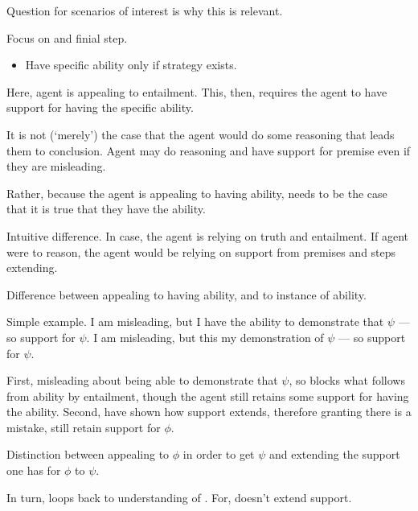 \begin{note}
  Question for scenarios of interest is why this is relevant.

  Focus on \AR{} and finial step.
  \begin{itemize}
  \item Have specific ability only if strategy exists.
  \end{itemize}
  Here, agent is appealing to entailment.
  This, then, requires the agent to have support for having the specific ability.

  It is not (`merely') the case that the agent would do some reasoning that leads them to conclusion.
  Agent may do reasoning and have support for premise even if they are misleading.

  Rather, because the agent is appealing to having ability, needs to be the case that it is true that they have the ability.

  
  Intuitive difference.
  In \AR{} case, the agent is relying on truth and entailment.
  If agent were to reason, the agent would be relying on support from premises and steps extending.

  Difference between appealing to having ability, and to instance of ability.

  Simple example.
  I am misleading, but I have the ability to demonstrate that \(\psi\) --- so support for \(\psi\).
  I am misleading, but this my demonstration of \(\psi\) --- so support for \(\psi\).

  First, misleading about being able to demonstrate that \(\psi\), so blocks what follows from ability by entailment, though the agent still retains some support for having the ability.
  Second, have shown how support extends, therefore granting there is a mistake, still retain support for \(\phi\).

  Distinction between appealing to \(\phi\) in order to get \(\psi\) and extending the support one has for \(\phi\) to \(\psi\).

  In turn, loops back to understanding of \nI{}.
  For, \nI{} doesn't extend support.
\end{note}


